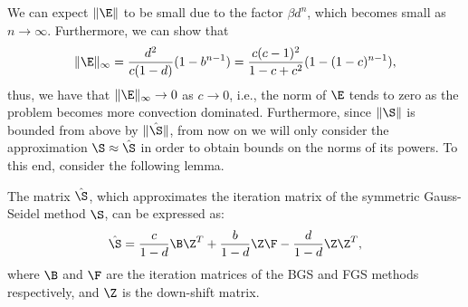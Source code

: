 We can expect $\|\E\|$ to be small due to the factor $\beta d^{n}$, which
becomes small as $n\rightarrow\infty$. Furthermore, we can show that
\begin{equation*}
\|\E\|_{\infty}=\frac{d^2}{c(1-d)}(1-b^{n-1})=\frac{c(c-1)^2}{1 - c +
c^2}(1-(1-c)^{n-1}),
\end{equation*}
thus, we have that $\|\E\|_{\infty}\rightarrow 0$ as $c\rightarrow 0$, i.e., the
norm of $\E$ tends to zero as the problem becomes more convection dominated.
Furthermore, since $\|\S\|$ is bounded from above by $\|\hat{\S}\|$, from now on
we will only consider the approximation $\S \approx \hat{\S}$ in order to obtain
bounds on the norms of its powers. To this end, consider the following lemma.
\begin{lemma}\label{lem:1D:structShat}
The matrix $\hat{\S}$, which approximates the iteration matrix of the symmetric
Gauss-Seidel method $\S$, can be expressed as:
\begin{equation}\label{eq:1D:S_hat_decomp}
\hat{\S}=\frac{c}{1-d}\B\Z^T+\frac{b}{1-d}\Z\F-\frac{d}{1-d}\Z\Z^T, %
\end{equation}
where $\B$ and $\F$ are the iteration matrices of the BGS and FGS methods
respectively, and $\Z$ is the down-shift matrix.
\end{lemma}
